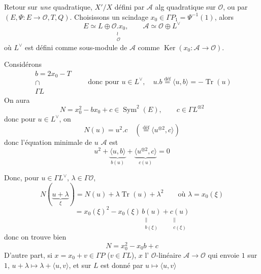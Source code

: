 \documentclass[11pt,a4paper]{article}
\begin{document}
Retour sur \emph{une} \struck{\ill{}} quadratique, $X'/X$ défini par $\mathcal{A}$ alg quadratique sur $\mathcal{O}$, ou par $(E, \Psi : E \to \mathcal{O}, T, Q)$. Choisissons un scindage $x_0 \in \Gamma P_1 = \Psi^{-1}(1)$, alors
\[
  E \simeq L \oplus \underset{\substack{\wr \\ \mathcal{O}}}{\mathcal{O}.x_0} , \qquad \mathcal{A} \simeq \mathcal{O} \oplus L^{\vee}
\]
où $L^{\vee}$ est défini comme sous-module de $\mathcal{A}$ \struck{\ill{}} comme $\operatorname{Ker}(x_0 : \mathcal{A} \to \mathcal{O})$.

Considérons
\[
  \boxed{\begin{array}{c} b = 2x_0 - T \\ \cap \\ \Gamma L \end{array}}
  \qquad
  \text{donc pour } u \in L^{\vee} ,\quad
  \boxed{u . b \overset{\text{déf}}{=} \langle u, b \rangle = -\operatorname{Tr}(u)}
\]
On aura
\[
  N = x_0^2 - b x_0 + c \in \operatorname{Sym}^2(E) , \qquad c \in \Gamma L^{\otimes 2}
\]
donc pour $u \in L^{\vee}$, on \ill{}
\[
  N(u) = u^2 . c \quad (\overset{\text{déf}}{=} \langle u^{\otimes 2}, c \rangle)
\]
donc l'équation minimale de $u$  $\mathcal{A}$ est
\[
  u^2 + \underbrace{\langle u, b \rangle}_{b(u)} + \underbrace{\langle u^{\otimes 2}, c \rangle}_{c(u)} = 0
\]
\struck{\ill{}}

Donc, pour $u \in \Gamma L^{\vee}$, $\lambda \in \Gamma \mathcal{O}$,
\[
  N(\underbrace{u + \lambda}_{\xi}) = N(u) + \lambda \operatorname{Tr}(u) + \lambda^2 \qquad \text{où } \lambda = x_0(\xi)
\]
\[
  = x_0(\xi)^2 - x_0(\xi)\, \underset{\substack{\| \\ b(\xi)}}{b(u)} + \underset{\substack{\| \\ c(\xi)}}{c(u)}
\]
donc on trouve bien
\[
  N = x_0^2 - x_0 b + c
\]
D'autre part, si $x = x_0 + v \in \Gamma P$ ($v \in \Gamma L$), \struck{\ill{}} $x$   l' \add{$\xi \mapsto$} $\mathcal{O}$-linéaire $\mathcal{A} \to \mathcal{O}$ qui envoie $1$ sur $1$, $u + \lambda \mapsto \lambda + \langle u, v \rangle$, et sur $L$ est donné par $u \mapsto \langle u, v \rangle$
\end{document}
